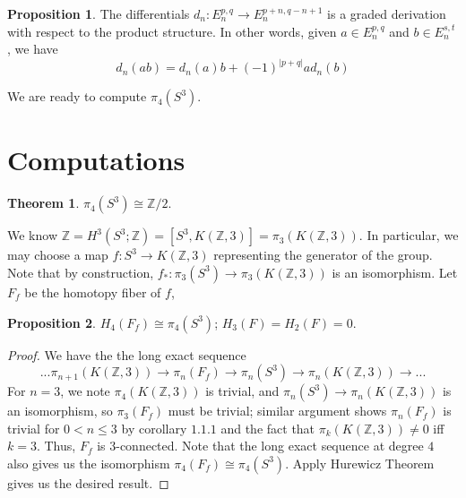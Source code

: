 \documentclass{article}
\theoremstyle{definition}
\newtheorem{theorem}{Theorem}[section]
\theoremstyle{definition}
\theoremstyle{definition}
\newtheorem{proposition}{Proposition}[section]
\theoremstyle{definition}
\theoremstyle{definition}
\theoremstyle{definition}
\theoremstyle{definition}
\begin{document}
\begin{tcolorbox}[colback=blue!5!white,colframe=blue!30!white]
\begin{proposition}
    The differentials $d_n: E_n ^{p,q}\to E_n ^{p+n, q-n+1}$ is a graded derivation with respect to the product structure. In other words, given $a\in E_n ^{p,q}$ and $b\in E_n^{s,t}$, we have 
    \[
        d_n(ab)=d_n(a)b+(-1)^{|p+q|}ad_n(b) 
    \]
\end{proposition}
\end{tcolorbox}
We are ready to compute $\pi_4(S^3)$.

\section{Computations}

\begin{tcolorbox}[colback=red!5!white,colframe=red!30!white]
\begin{theorem}
    $\pi_4(S^3)\cong \mathbb{Z}/2$.
\end{theorem}
\end{tcolorbox}
We know $\mathbb{Z}=H^3(S^3;\mathbb{Z})=[S^3,K(\mathbb{Z},3)]=\pi_3(K(\mathbb{Z},3))$. In particular, we may choose a map $f: S^3\to K(\mathbb{Z},3)$ representing the generator of the group. Note that by construction, $f_*: \pi_3(S^3)\to \pi_3(K(\mathbb{Z},3))$ is an isomorphism. Let $F_f$ be the homotopy fiber of $f$,

\begin{tcolorbox}[colback=blue!5!white,colframe=blue!30!white]
\begin{proposition}
$H_4(F_f)\cong \pi_4(S^3)$; $H_3(F)=H_2(F)=0$.
\end{proposition}
\end{tcolorbox}

\begin{proof}
We have the the long exact sequence 
\[ ...\pi_{n+1}(K(\mathbb{Z},3))\to\pi_n(F_f)\to \pi_n(S^3)\to \pi_n(K(\mathbb{Z},3))\to...\]
For $n=3$, we note $\pi_{4}(K(\mathbb{Z},3))$ is trivial, and $\pi_n(S^3)\to \pi_n(K(\mathbb{Z},3))$ is an isomorphism, so $\pi_3(F_f)$ must be trivial; similar argument shows $\pi_n(F_f)$ is trivial for $0<n\leq 3$ by corollary $1.1.1$ and the fact that $\pi_k(K(\mathbb{Z},3))\neq 0$ iff $k=3$. Thus, $F_f$ is $3$-connected. Note that the long exact sequence at degree $4$ also gives us the isomorphism $\pi_4(F_f)\cong \pi_4(S^3)$. Apply Hurewicz Theorem gives us the desired result.
\end{proof}
\end{document}
